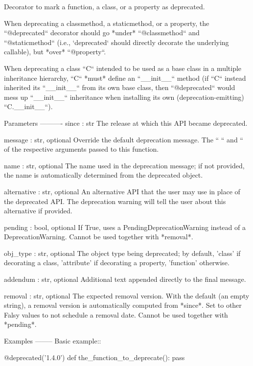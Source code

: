\begin{DoxyVerb}Decorator to mark a function, a class, or a property as deprecated.

When deprecating a classmethod, a staticmethod, or a property, the
``@deprecated`` decorator should go *under* ``@classmethod`` and
``@staticmethod`` (i.e., `deprecated` should directly decorate the
underlying callable), but *over* ``@property``.

When deprecating a class ``C`` intended to be used as a base class in a
multiple inheritance hierarchy, ``C`` *must* define an ``__init__`` method
(if ``C`` instead inherited its ``__init__`` from its own base class, then
``@deprecated`` would mess up ``__init__`` inheritance when installing its
own (deprecation-emitting) ``C.__init__``).

Parameters
----------
since : str
    The release at which this API became deprecated.

message : str, optional
    Override the default deprecation message.  The ``%
    ``%
    and ``%
    of the respective arguments passed to this function.

name : str, optional
    The name used in the deprecation message; if not provided, the name
    is automatically determined from the deprecated object.

alternative : str, optional
    An alternative API that the user may use in place of the deprecated
    API.  The deprecation warning will tell the user about this alternative
    if provided.

pending : bool, optional
    If True, uses a PendingDeprecationWarning instead of a
    DeprecationWarning.  Cannot be used together with *removal*.

obj_type : str, optional
    The object type being deprecated; by default, 'class' if decorating
    a class, 'attribute' if decorating a property, 'function' otherwise.

addendum : str, optional
    Additional text appended directly to the final message.

removal : str, optional
    The expected removal version.  With the default (an empty string), a
    removal version is automatically computed from *since*.  Set to other
    Falsy values to not schedule a removal date.  Cannot be used together
    with *pending*.

Examples
--------
Basic example::

    @deprecated('1.4.0')
    def the_function_to_deprecate():
        pass
\end{DoxyVerb}
 \mbox{\label{namespacematplotlib_1_1__api_1_1deprecation_ad02d93f42fc564edba6813c27483df9c}} 
